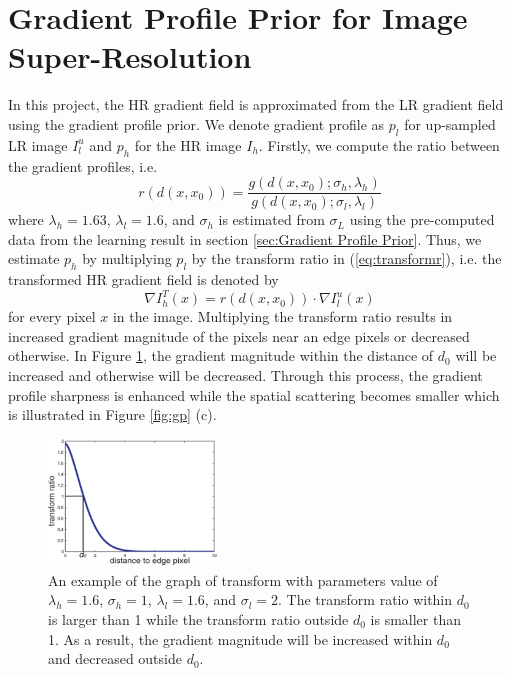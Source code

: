 \documentclass[a4paper,11pt]{article}
\begin{document}
\section{Gradient Profile Prior for Image Super-Resolution}
\label{sec:Gradient Profile Prior for Image Super-Resolution}

In this project, the HR gradient field is approximated from the LR gradient field using the gradient profile prior. We denote gradient profile as $p_l$ for up-sampled LR image $I_l^u$ and $p_h$ for the HR image $I_h$. Firstly, we compute the ratio between the gradient profiles, i.e.
\begin{equation}
	\label{eq:transformr}
	r(d(x, x_0)) = \frac{g(d(x, x_0); \sigma_h, \lambda_h)}{g(d(x, x_0); \sigma_l, \lambda_l)}
\end{equation}
where $\lambda_h=1.63$, $\lambda_l=1.6$, and $\sigma_h$ is estimated from $\sigma_L$ using the pre-computed data from the learning result in section \ref{sec:Gradient Profile Prior}. Thus, we estimate $p_h$ by multiplying $p_l$ by the transform ratio in (\ref{eq:transformr}), i.e. the transformed HR gradient field is denoted by
\begin{equation}
	\label{eq:transformgrad}
	\nabla I_h^T(x) = r(d(x, x_0)) \cdot \nabla I_l^u(x)
\end{equation}
for every pixel $x$ in the image. Multiplying the transform ratio results in increased gradient magnitude of the pixels near an edge pixels or decreased otherwise. In Figure \ref{fig:picture1}, the gradient magnitude within the distance of $d_0$ will be increased and otherwise will be decreased. Through this process, the gradient profile sharpness is enhanced while the spatial scattering becomes smaller which is illustrated in Figure \ref{fig:gp} (c).

\begin{figure}[H]
	\centering
	\includegraphics[width=0.4\textwidth]{Picture1.png}
	\caption{An example of the graph of transform with parameters value of $\lambda_h=1.6$, $\sigma_h=1$, $\lambda_l=1.6$, and $\sigma_l=2$. The transform ratio within $d_0$ is larger than 1 while the transform ratio outside $d_0$ is smaller than 1. As a result, the gradient magnitude will be increased within $d_0$ and decreased outside $d_0$.}
	\label{fig:picture1}
\end{figure}
\end{document}
